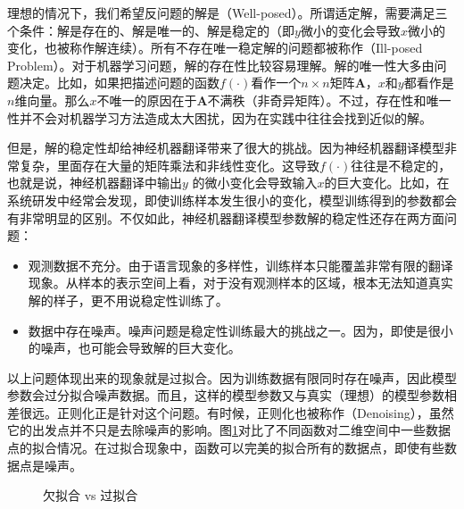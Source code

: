 \parinterval 理想的情况下，我们希望反问题的解是{\small{}}（Well-posed）。所谓适定解，需要满足三个条件：解是存在的、解是唯一的、解是稳定的（即$y$微小的变化会导致$x$微小的变化，也被称作解连续）。所有不存在唯一稳定解的问题都被称作{\small{}}（Ill-posed Problem）。对于机器学习问题，解的存在性比较容易理解。解的唯一性大多由问题决定。比如，如果把描述问题的函数$f(\cdot)$看作一个$n\times n$矩阵$\mathbf{A}$，$x$和$y$都看作是$n$维向量。那么$x$不唯一的原因在于$\mathbf{A}$不满秩（非奇异矩阵）。不过，存在性和唯一性并不会对机器学习方法造成太大困扰，因为在实践中往往会找到近似的解。

\parinterval 但是，解的稳定性却给神经机器翻译带来了很大的挑战。因为神经机器翻译模型非常复杂，里面存在大量的矩阵乘法和非线性变化。这导致$f(\cdot)$往往是不稳定的，也就是说，神经机器翻译中输出$y$ 的微小变化会导致输入$x$的巨大变化。比如，在系统研发中经常会发现，即使训练样本发生很小的变化，模型训练得到的参数都会有非常明显的区别。不仅如此，神经机器翻译模型参数解的稳定性还存在两方面问题：

\begin{itemize}
\vspace{0.5em}
\item 观测数据不充分。由于语言现象的多样性，训练样本只能覆盖非常有限的翻译现象。从样本的表示空间上看，对于没有观测样本的区域，根本无法知道真实解的样子，更不用说稳定性训练了。
\vspace{0.5em}
\item 数据中存在噪声。噪声问题是稳定性训练最大的挑战之一。因为，即使是很小的噪声，也可能会导致解的巨大变化。
\vspace{0.5em}
\end{itemize}

\parinterval 以上问题体现出来的现象就是过拟合。因为训练数据有限同时存在噪声，因此模型参数会过分拟合噪声数据。而且，这样的模型参数又与真实（理想）的模型参数相差很远。正则化正是针对这个问题。有时候，正则化也被称作{\small{}}（Denoising），虽然它的出发点并不只是去除噪声的影响。图\ref{fig:7-11}对比了不同函数对二维空间中一些数据点的拟合情况。在过拟合现象中，函数可以完美的拟合所有的数据点，即使有些数据点是噪声。

\begin{figure}[htp]
\centering

\caption{欠拟合 vs 过拟合}
\label{fig:7-11}
\end{figure}

